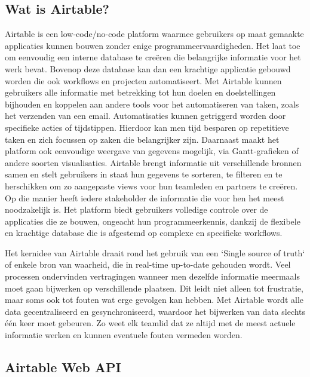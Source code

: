 \subsection{Wat is Airtable?}


Airtable is een low-code/no-code platform waarmee gebruikers op maat gemaakte applicaties kunnen bouwen zonder enige programmeervaardigheden. Het laat toe om eenvoudig een interne database te creëren die belangrijke informatie voor het werk bevat. Bovenop deze database kan dan een krachtige applicatie gebouwd worden die ook workflows en projecten automatiseert. Met Airtable kunnen gebruikers alle informatie met betrekking tot hun doelen en doelstellingen bijhouden en koppelen aan andere tools voor het automatiseren van taken, zoals het verzenden van een email. Automatisaties kunnen getriggerd worden door specifieke acties of tijdstippen. Hierdoor kan men tijd besparen op repetitieve taken en zich focussen op zaken die belangrijker zijn. Daarnaast maakt het platform ook eenvoudige weergave van gegevens mogelijk, via Gantt-grafieken of andere soorten visualisaties. Airtable brengt informatie uit verschillende bronnen samen en stelt gebruikers in staat hun gegevens te sorteren, te filteren en te herschikken om zo aangepaste views voor hun teamleden en partners te creëren. Op die manier heeft iedere stakeholder de informatie die voor hen het meest noodzakelijk is. Het platform biedt gebruikers volledige controle over de applicaties die ze bouwen, ongeacht hun programmeerkennis, dankzij de flexibele en krachtige database die is afgestemd op complexe en specifieke workflows.
\autocite{AirtableWhat}


Het kernidee van Airtable draait rond het gebruik van een `Single source of truth` of enkele bron van waarheid, die in real-time up-to-date gehouden wordt. Veel processen ondervinden vertragingen 
wanneer men dezelfde informatie meermaals moet gaan bijwerken op verschillende plaatsen. Dit leidt niet alleen tot frustratie, maar soms ook tot fouten wat erge gevolgen kan hebben. Met Airtable wordt alle data gecentraliseerd en gesynchroniseerd, waardoor het bijwerken van data slechts één keer moet gebeuren. Zo weet elk teamlid dat ze altijd met de meest actuele informatie werken en kunnen eventuele fouten vermeden worden. \autocite{AirtableWhat}

\subsection{Airtable Web API}

